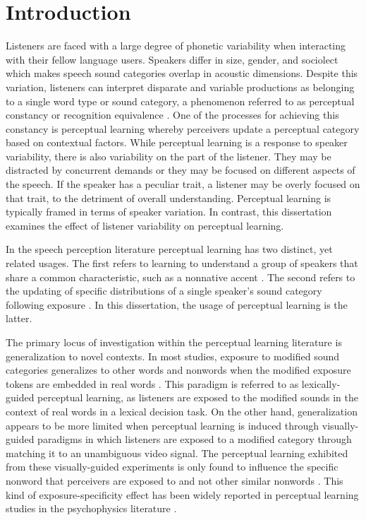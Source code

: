 
\chapter{Introduction}
\label{chap:intro}

Listeners are faced with a large degree of phonetic variability when interacting with their fellow language users.  
Speakers differ in size, gender, and sociolect which makes speech sound categories overlap in acoustic dimensions.
Despite this variation, listeners can interpret disparate and variable productions as belonging to a single word type or sound category, a phenomenon referred to as perceptual constancy \citep{Shankweiler1977, Kuhl1979} or recognition equivalence \citep{Sumner2013}.
One of the processes for achieving this constancy is perceptual learning whereby perceivers update a perceptual category based on contextual factors.
While perceptual learning is a response to speaker variability, there is also variability on the part of the listener.
They may be distracted by concurrent demands or they may be focused on different aspects of the speech.
If the speaker has a peculiar trait, a listener may be overly focused on that trait, to the detriment of overall understanding.
Perceptual learning is typically framed in terms of speaker variation.
In contrast, this dissertation examines the effect of listener variability on perceptual learning.

In the speech perception literature perceptual learning has two distinct, yet related usages.
The first refers to learning to understand a group of speakers that share a common characteristic, such as a nonnative accent \citep{Bradlow2008}.
The second refers to the updating of specific distributions of a single speaker's sound category following exposure \citep{Norris2003}.
In this dissertation, the usage of perceptual learning is the latter.

The primary locus of investigation within the perceptual learning literature is generalization to novel contexts.
In most studies, exposure to modified sound categories generalizes to other words and nonwords when the modified exposure tokens are embedded in real words \citep{Norris2003, Reinisch2013}.  
This paradigm is referred to as lexically-guided perceptual learning, as listeners are exposed to the modified sounds in the context of real words in a lexical decision task.
On the other hand, generalization appears to be more limited when perceptual learning is induced through visually-guided paradigms in which listeners are exposed to a modified category through matching it to an unambiguous video signal.  
The perceptual learning exhibited from these visually-guided experiments is only found to influence the specific nonword that perceivers are exposed to and not other similar nonwords \citep{Reinisch2014}.  
This kind of exposure-specificity effect has been widely reported in perceptual learning studies in the psychophysics literature \citep[for review]{Gibson1953}.


